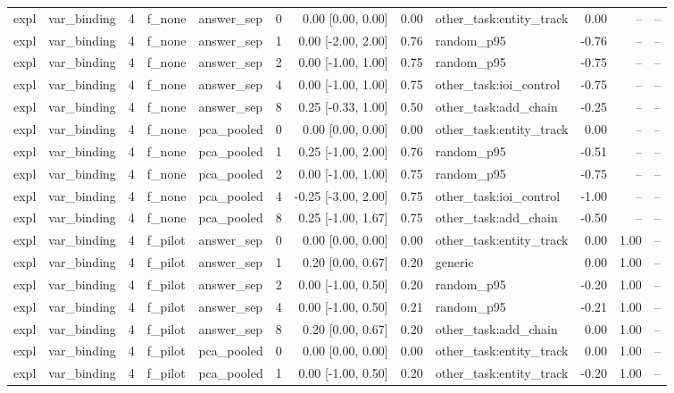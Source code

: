 \begin{tabular}{llrllrrrlrrr}
expl & var\_binding & 4 & f\_none & answer\_sep & 0 & 0.00 [0.00, 0.00] & 0.00 & other\_task:entity\_track & 0.00 & -- & -- \\
expl & var\_binding & 4 & f\_none & answer\_sep & 1 & 0.00 [-2.00, 2.00] & 0.76 & random\_p95 & -0.76 & -- & -- \\
expl & var\_binding & 4 & f\_none & answer\_sep & 2 & 0.00 [-1.00, 1.00] & 0.75 & random\_p95 & -0.75 & -- & -- \\
expl & var\_binding & 4 & f\_none & answer\_sep & 4 & 0.00 [-1.00, 1.00] & 0.75 & other\_task:ioi\_control & -0.75 & -- & -- \\
expl & var\_binding & 4 & f\_none & answer\_sep & 8 & 0.25 [-0.33, 1.00] & 0.50 & other\_task:add\_chain & -0.25 & -- & -- \\
expl & var\_binding & 4 & f\_none & pca\_pooled & 0 & 0.00 [0.00, 0.00] & 0.00 & other\_task:entity\_track & 0.00 & -- & -- \\
expl & var\_binding & 4 & f\_none & pca\_pooled & 1 & 0.25 [-1.00, 2.00] & 0.76 & random\_p95 & -0.51 & -- & -- \\
expl & var\_binding & 4 & f\_none & pca\_pooled & 2 & 0.00 [-1.00, 1.00] & 0.75 & random\_p95 & -0.75 & -- & -- \\
expl & var\_binding & 4 & f\_none & pca\_pooled & 4 & -0.25 [-3.00, 2.00] & 0.75 & other\_task:ioi\_control & -1.00 & -- & -- \\
expl & var\_binding & 4 & f\_none & pca\_pooled & 8 & 0.25 [-1.00, 1.67] & 0.75 & other\_task:add\_chain & -0.50 & -- & -- \\
expl & var\_binding & 4 & f\_pilot & answer\_sep & 0 & 0.00 [0.00, 0.00] & 0.00 & other\_task:entity\_track & 0.00 & 1.00 & -- \\
expl & var\_binding & 4 & f\_pilot & answer\_sep & 1 & 0.20 [0.00, 0.67] & 0.20 & generic & 0.00 & 1.00 & -- \\
expl & var\_binding & 4 & f\_pilot & answer\_sep & 2 & 0.00 [-1.00, 0.50] & 0.20 & random\_p95 & -0.20 & 1.00 & -- \\
expl & var\_binding & 4 & f\_pilot & answer\_sep & 4 & 0.00 [-1.00, 0.50] & 0.21 & random\_p95 & -0.21 & 1.00 & -- \\
expl & var\_binding & 4 & f\_pilot & answer\_sep & 8 & 0.20 [0.00, 0.67] & 0.20 & other\_task:add\_chain & 0.00 & 1.00 & -- \\
expl & var\_binding & 4 & f\_pilot & pca\_pooled & 0 & 0.00 [0.00, 0.00] & 0.00 & other\_task:entity\_track & 0.00 & 1.00 & -- \\
expl & var\_binding & 4 & f\_pilot & pca\_pooled & 1 & 0.00 [-1.00, 0.50] & 0.20 & other\_task:entity\_track & -0.20 & 1.00 & -- \\

\end{tabular}
